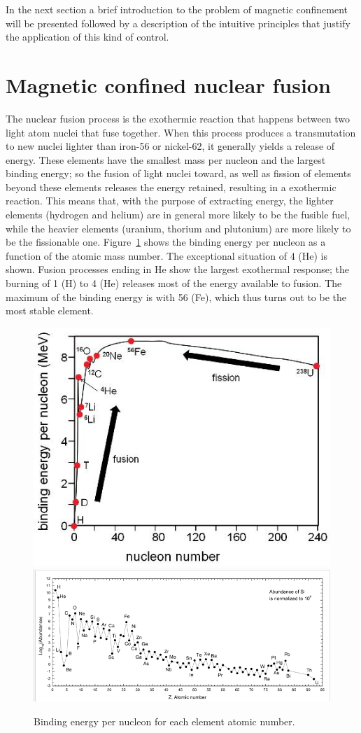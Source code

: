 In the next section a brief introduction to the problem of magnetic confinement will be presented followed by a description of the intuitive principles that justify the application of this kind of control.




\section{Magnetic confined nuclear fusion}
The nuclear fusion process is the exothermic reaction that happens between two light atom nuclei that fuse together. When this process produces a transmutation to new nuclei lighter than iron-56 or nickel-62, it generally yields a release of energy. These elements have the smallest mass per nucleon and the largest binding energy; so the fusion of light nuclei toward, as well as fission of elements beyond these elements releases the energy retained, resulting in a exothermic reaction.  This means that, with the purpose of extracting energy, the lighter elements (hydrogen and helium) are in general more likely to be the fusible fuel, while the heavier elements (uranium, thorium and plutonium) are more likely to be the fissionable one. 
Figure~\ref{fig:binding} shows the binding energy per nucleon as a function of the atomic mass number. The exceptional situation of 4 (He) is shown. Fusion processes ending in He show the largest exothermal response; the burning of 1 (H) to 4 (He) releases most of the energy available to fusion. The maximum of the binding energy is with 56 (Fe), which thus turns out to be the most stable element.
\begin{figure}[ht!]
\includegraphics[height=0.25\textwidth]{img/binding_energy.jpg} \centering
\includegraphics[height=0.25\textwidth]{img/abundance.png} \centering
\caption{Binding energy per nucleon for each element atomic number. }
\label{fig:binding}
\end{figure}

